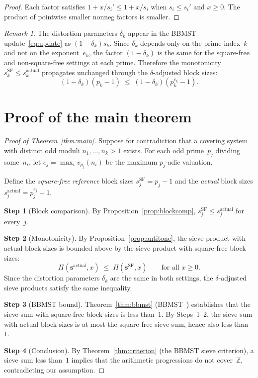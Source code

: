 \documentclass[11pt]{amsart}
\theoremstyle{definition}
\theoremstyle{remark}
\newtheorem{remark}[theorem]{Remark}
\begin{document}
\begin{proof}
Each factor satisfies $1 + x/s_i' \leq 1 + x/s_i$ when $s_i \leq s_i'$ and $x \geq 0$.
The product of pointwise smaller nonneg factors is smaller.
\end{proof}

\begin{remark}
The distortion parameters $\delta_k$ appear in the BBMST update~\eqref{eq:update}
as $(1 - \delta_k) s_k$. Since $\delta_k$ depends only on the prime index~$k$ and not
on the exponent~$e_k$, the factor $(1 - \delta_k)$ is the same for the square-free
and non-square-free settings at each prime. Therefore the monotonicity
$s_k^{\mathrm{SF}} \leq s_k^{\mathrm{actual}}$ propagates unchanged through the
$\delta$-adjusted block sizes:
\[
  (1 - \delta_k)(p_k - 1) \;\leq\; (1 - \delta_k)(p_k^{e_k} - 1).
\]
\end{remark}

\section{Proof of the main theorem}

\begin{proof}[Proof of Theorem~\ref{thm:main}]
Suppose for contradiction that a covering system with distinct odd moduli
$n_1, \ldots, n_k > 1$ exists. For each odd prime~$p_j$ dividing some~$n_i$,
let $e_j = \max_i v_{p_j}(n_i)$ be the maximum $p_j$-adic valuation.

Define the \emph{square-free reference} block sizes $s_j^{\mathrm{SF}} = p_j - 1$
and the \emph{actual} block sizes $s_j^{\mathrm{actual}} = p_j^{e_j} - 1$.

\smallskip
\noindent\textbf{Step 1} (Block comparison).
By Proposition~\ref{prop:blockcomp}, $s_j^{\mathrm{SF}} \leq s_j^{\mathrm{actual}}$
for every~$j$.

\smallskip
\noindent\textbf{Step 2} (Monotonicity).
By Proposition~\ref{prop:antitone}, the sieve product with actual block sizes is
bounded above by the sieve product with square-free block sizes:
\[
  \Pi(\mathbf{s}^{\mathrm{actual}}, x)
  \;\leq\;
  \Pi(\mathbf{s}^{\mathrm{SF}}, x)
  \qquad \text{for all } x \geq 0.
\]
Since the distortion parameters $\delta_k$ are the same in both settings, the
$\delta$-adjusted sieve products satisfy the same inequality.

\smallskip
\noindent\textbf{Step 3} (BBMST bound).
Theorem~\ref{thm:bbmst} (BBMST~\cite{BBMST2019}) establishes that the sieve sum with
square-free block sizes is less than~$1$.
By Steps~1--2, the sieve sum with actual block sizes is at most the square-free sieve sum,
hence also less than~$1$.

\smallskip
\noindent\textbf{Step 4} (Conclusion).
By Theorem~\ref{thm:criterion} (the BBMST sieve criterion), a sieve sum less than~$1$
implies that the arithmetic progressions do not cover~$\mathbb{Z}$, contradicting our
assumption.
\end{proof}
\end{document}
